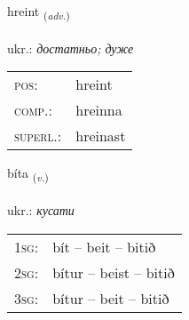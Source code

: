 \documentclass[frontgrid, backgrid]{flacards}\usepackage[]{graphicx}\usepackage[]{xcolor}
\begin{document}
\renewcommand{\flhead}{\vskip5pt \fboxsep=0pt {\small\bfseries\footnotesize Atviksorð | прислівник}}
\renewcommand{\fcfoot}{\vskip5pt \fboxsep=0pt \hspace{2pt}{\small\bfseries\footnotesize 3K}}

\renewcommand{\blhead}{\vskip5pt {\small\bfseries\footnotesize Atviksorð | прислівник }}
\renewcommand{\bcfoot}{\vskip5pt \hspace{2pt}{\small\bfseries\footnotesize 3K}}


{hreint \small{\textsubscript{(\textit{adv.})}} \\[1ex] %
\textphonetic{[r̥ein̥t]} \\
ukr.: \emph{достатньо; дуже} \\  [2ex]
\renewcommand*{\arraystretch}{0.8}
\begin{tabular}{ll}
\textsc{pos}: & hreint \\ 
\textsc{comp.}: & hreinna \\ 
\textsc{superl.}: & hreinast \\
\end{tabular}
}

\renewcommand{\flhead}{\vskip5pt \fboxsep=0pt {\small\bfseries\footnotesize Sagnorð | дієслово}}
\renewcommand{\fcfoot}{\vskip5pt \fboxsep=0pt \hspace{2pt}{\small\bfseries\footnotesize 3K}}

\renewcommand{\blhead}{\vskip5pt {\small\bfseries\footnotesize Sagnorð | дієслово }}
\renewcommand{\bcfoot}{\vskip5pt \hspace{2pt}{\small\bfseries\footnotesize 3K}}


{bíta \small{\textsubscript{(\textit{v.})}} \\[1ex] %
\textphonetic{[piːta]} \\
ukr.: \emph{кусати} \\  [2ex]
\renewcommand*{\arraystretch}{0.8}
\begin{tabular}{p{1cm}l}
\textsc{1sg}: & bít -- beit -- bitið \\ 
\textsc{2sg}: & bítur -- beist -- bitið \\ 
\textsc{3sg}: & bítur -- beit -- bitið \\ 
\end{tabular}
}
\end{document}
